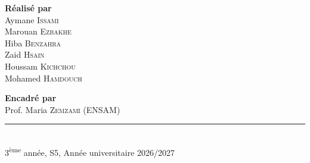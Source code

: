\begin{titlepage}
    \vfill

    \begin{minipage}[t]{0.5\textwidth}
        \centering
        {\normalsize\textbf{Réalisé par}}\\[0.2cm]
        Aymane \textsc{Issami}\\[0.05cm]
        Marouan \textsc{Ezbakhe}\\[0.05cm]
        Hiba \textsc{Benzahra}\\[0.05cm]
        Zaid \textsc{Hsain}\\[0.05cm]
        Houssam \textsc{Kichchou}\\[0.05cm]
        Mohamed \textsc{Hamdouch}
    \end{minipage}\hfill
    \begin{minipage}[t]{0.46\textwidth}
        \centering
        {\normalsize\textbf{Encadré par}}\\[0.2cm]
        Prof. Maria \textsc{Zemzami} {\small (ENSAM)}
    \end{minipage}

    \vfill

    {\color{ensambleu}\rule{\textwidth}{0.8pt}}\\[0.2cm]
    {\small 3\textsuperscript{ème} année, S5, Année universitaire 2026/2027}

\end{titlepage}

